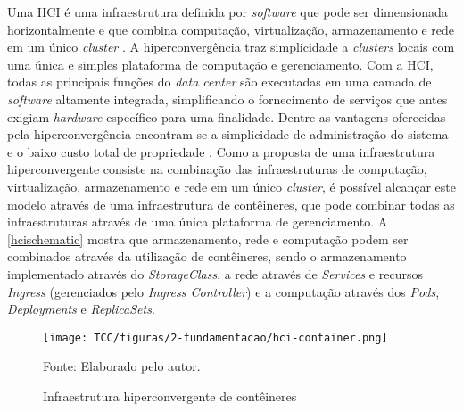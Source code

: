 Uma \ac{HCI} é uma infraestrutura definida por \textit{software} que pode ser dimensionada horizontalmente \cite{vmwarehyperconvergence} e que combina computação, virtualização, armazenamento e rede em um único \textit{cluster} \cite{ciscohyperconvergence}. A hiperconvergência traz simplicidade a \textit{clusters} locais com uma única e simples plataforma de computação e gerenciamento. Com a \ac{HCI}, todas as principais funções do \textit{data center} são executadas em uma camada de \textit{software} altamente integrada, simplificando o fornecimento de serviços que antes exigiam \textit{hardware} específico para uma finalidade. Dentre as vantagens oferecidas pela hiperconvergência encontram-se a simplicidade de administração do sistema e o baixo custo total de propriedade \cite{vmwarehyperconvergence}. Como a proposta de uma infraestrutura hiperconvergente consiste na combinação das infraestruturas de computação, virtualização, armazenamento e rede em um único \textit{cluster}, é possível alcançar este modelo através de uma infraestrutura de contêineres, que pode combinar todas as infraestruturas através de uma única plataforma de gerenciamento. A \autoref{hcischematic} mostra que armazenamento, rede e computação podem ser combinados através da utilização de contêineres, sendo o armazenamento implementado através do \textit{StorageClass}, a rede através de \textit{Services} e recursos \textit{Ingress} (gerenciados pelo \textit{Ingress Controller}) e a computação através dos \textit{Pods}, \textit{Deployments} e \textit{ReplicaSets}.

\begin{figure}[!htpb]
	\centering
	\caption{Infraestrutura hiperconvergente de contêineres}
    \texttt{[image: TCC/figuras/2-fundamentacao/hci-container.png]}
    
	Fonte: Elaborado pelo autor.
 	\label{hcischematic}
\end{figure}